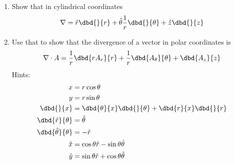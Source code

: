 
\begin{enumerate}
	\item {}
Show that in cylindrical coordinates 
\begin{align}
\nabla = \hat{r} \dbd{}{r} + \hat{\theta} \frac{1}{r} \dbd{}{\theta} + \hat{z}
\dbd{}{z}
\end{align}
\item {} Use that to show that the divergence of a vector in polar coordinates is 
\begin{align}
\nabla \cdot A = \frac{1}{r} \dbd{r A_r}{r} + \frac{1}{r} \dbd{A_\theta}{\theta}
+ \dbd{A_z}{z}
\end{align}
Hints: 
\begin{align}
x&=r\cos\theta\\
y&=r\sin\theta\\
\dbd{}{x} &= \dbd{\theta}{x}\dbd{}{\theta} + \dbd{r}{x}\dbd{}{r}\\
\dbd{\hat{r}}{\theta} &= \hat{\theta} \\ 
\dbd{\hat{\theta}}{\theta}&=-\hat{r}\\
\hat{x} &= \cos\theta \hat{r} - \sin\theta \hat{\theta}\\
\hat{y} &= \sin\theta \hat{r} + \cos\theta \hat{\theta}
\end{align}
\end{enumerate}
